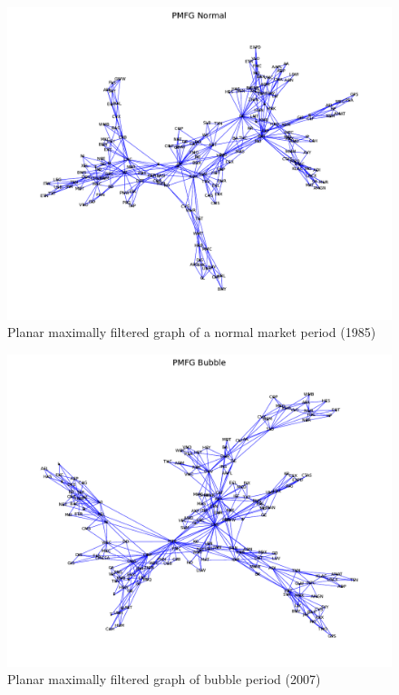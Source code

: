 \documentclass[sigchi]{acmart}
\begin{document}
\begin{figure}[H]
	\centering
	\includegraphics[width=\linewidth]{PMFG Normal.pdf}
	\caption{Planar maximally filtered graph of a normal market period (1985)}
\end{figure}
\begin{figure}[H]
	\centering
	\includegraphics[width=\linewidth]{PMFG Bubble.pdf}
	\caption{Planar maximally filtered graph of bubble period (2007)}
\end{figure}
\end{document}

